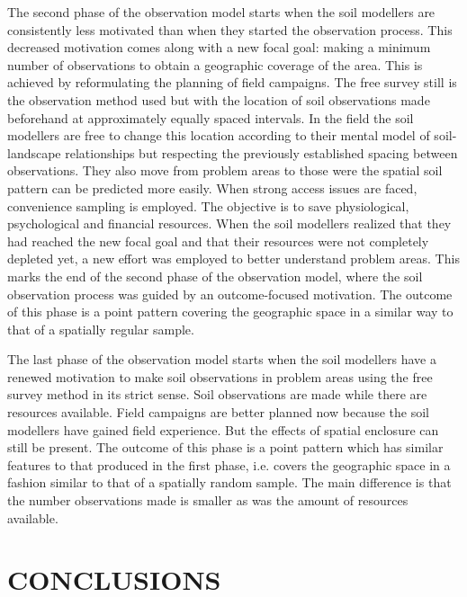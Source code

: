 The second phase of the observation model starts when the soil modellers are consistently less motivated than 
when they started the observation process. This decreased motivation comes along with a new focal goal: making 
a minimum number of observations to obtain a  geographic coverage of the area. This is achieved 
by reformulating the planning of field campaigns. The free survey still is the observation method used but 
with the location of soil observations made beforehand at approximately equally spaced intervals. In the field 
the soil modellers are free to change this location according to their mental model of soil-landscape 
relationships but respecting the previously established spacing between observations. They also move from 
problem areas to those were the spatial soil pattern can be predicted more easily. When strong access issues 
are faced, convenience sampling is employed. The objective is to save physiological, psychological and 
financial resources. When the soil modellers realized that they had reached the new focal goal and that their
resources were not completely depleted yet, a new effort was employed to better understand problem areas. This 
marks the end of the second phase of the observation model, where the soil observation process was guided by an
outcome-focused motivation. The outcome of this phase is a point pattern covering the geographic space in a 
similar way to that of a spatially regular sample.

The last phase of the observation model starts when the soil modellers have a renewed motivation to make soil 
observations in problem areas using the free survey method in its strict sense. Soil observations are made 
while there are resources available. Field campaigns are better planned now because the soil modellers have 
gained field experience. But the effects of spatial enclosure can still be present. The outcome of 
this phase is a point pattern which has similar features to that produced in the first phase, i.e. covers the 
geographic space in a fashion similar to that of a spatially random sample. The main difference is that the 
number observations made is smaller as was the amount of resources available.

\section{CONCLUSIONS}

